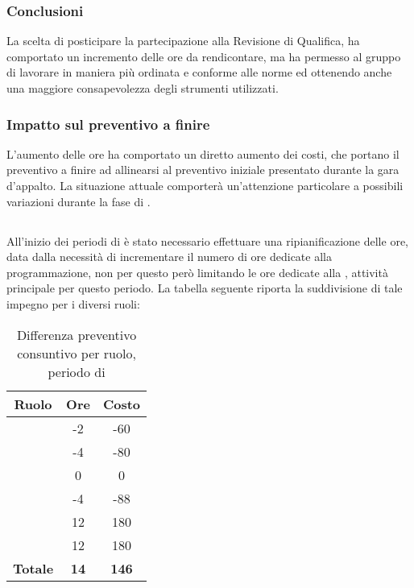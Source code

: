 \subsubsection{Conclusioni}
La scelta di posticipare la partecipazione alla Revisione di Qualifica, ha comportato un incremento delle ore da rendicontare, ma ha permesso al gruppo di lavorare in maniera più ordinata e conforme alle norme ed ottenendo anche una maggiore consapevolezza degli strumenti utilizzati.

\subsubsection{Impatto sul preventivo a finire}
L'aumento delle ore ha comportato un diretto aumento dei costi, che portano il preventivo a finire ad allinearsi al preventivo iniziale presentato durante la gara d'appalto.
La situazione attuale comporterà un'attenzione particolare a possibili variazioni durante la fase di \VV{}.

\subsection{\VV{}}\label{consuntivoVV}
All'inizio dei periodi di \VV{} è stato necessario effettuare una ripianificazione delle ore, data dalla necessità di incrementare il numero di ore dedicate alla programmazione, non per questo però limitando le ore dedicate alla \VV{}, attività principale per questo periodo. La tabella seguente riporta la suddivisione di tale impegno per i diversi ruoli:
\begin{table}[H]
	\centering
	\begin{tabular}{|c|c|c|}
		\hline
		\textbf{Ruolo} &
		\textbf{Ore} &
		\textbf{Costo} \\
		\hline
		\Responsabile & -2 & -60\\
		\hline
		\Amministratore & -4 & -80\\
		\hline
		\Analista & 0 & 0\\
		\hline
		\Progettista & -4 & -88 \\
		\hline
		\Verificatore & 12 & 180 \\
		\hline
		\Programmatore & 12 & 180 \\
		\hline
		\textbf{Totale} & \textbf{14} & \textbf{146} \\
		\hline
	\end{tabular}
	\caption{Differenza preventivo consuntivo per ruolo, periodo di \VV}
\end{table}

